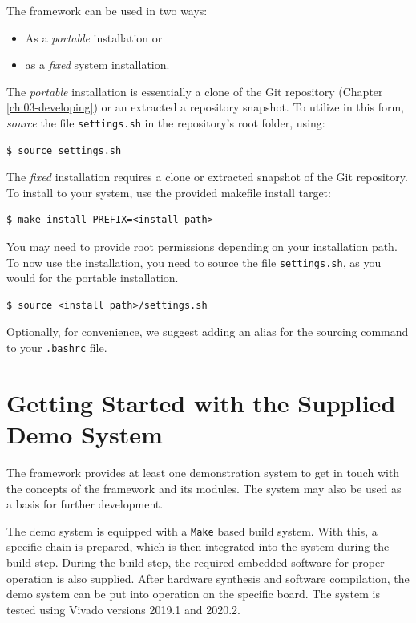 The \asterics framework can be used in two ways:

\begin{itemize}
\item As a \textit{portable} installation or
\item as a \textit{fixed} system installation.
\end{itemize}

The \textit{portable} installation is essentially a clone of the \asterics Git repository (Chapter \ref{ch:03-developing}) or an extracted a repository snapshot.
To utilize \asterics in this form, \textit{source} the file \texttt{settings.sh} in the repository's root folder, using:

\begin{lstlisting}[style=shell]
  $ source settings.sh
\end{lstlisting}

\bigskip

The \textit{fixed} installation requires a clone or extracted snapshot of the \asterics Git repository.
To install \asterics to your system, use the provided makefile install target:

\begin{lstlisting}[style=shell]
  $ make install PREFIX=<install path>
\end{lstlisting}

You may need to provide root permissions depending on your installation path.
To now use the installation, you need to source the file \texttt{settings.sh}, as you would for the portable installation.

\begin{lstlisting}[style=shell]
  $ source <install path>/settings.sh
\end{lstlisting}

Optionally, for convenience, we suggest adding an alias for the sourcing command to your \texttt{.bashrc} file.


\section{Getting Started with the Supplied Demo System}
\label{sec:02-getting_started}

The \asterics framework provides at least one demonstration system to get in touch with the concepts of the framework and its modules.
The system may also be used as a basis for further development.

The demo system is equipped with a \texttt{Make} based build system.
With this, a specific \asterics chain is prepared, which is then integrated into the system during the build step.
During the build step, the required embedded software for proper operation is also supplied.
After hardware synthesis and software compilation, the demo system can be put into operation on the specific board.
The system is tested using Vivado versions 2019.1 and 2020.2.


